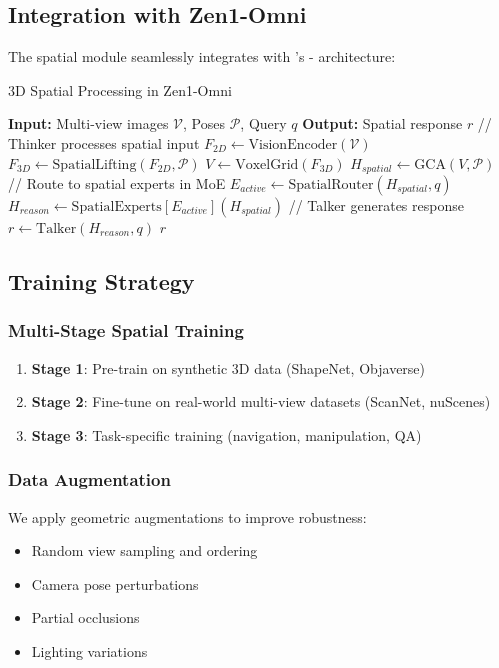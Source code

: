 \subsection{Integration with Zen1-Omni}

The spatial module seamlessly integrates with \zen{}'s \thinker{}-\talker{} architecture:

\begin{algorithm}
\caption{3D Spatial Processing in Zen1-Omni}
\begin{algorithmic}[1]
\STATE \textbf{Input:} Multi-view images $\mathcal{V}$, Poses $\mathcal{P}$, Query $q$
\STATE \textbf{Output:} Spatial response $r$
\STATE // Thinker processes spatial input
\STATE $F_{2D} \leftarrow \text{VisionEncoder}(\mathcal{V})$
\STATE $F_{3D} \leftarrow \text{SpatialLifting}(F_{2D}, \mathcal{P})$
\STATE $V \leftarrow \text{VoxelGrid}(F_{3D})$
\STATE $H_{spatial} \leftarrow \text{GCA}(V, \mathcal{P})$
\STATE // Route to spatial experts in MoE
\STATE $E_{active} \leftarrow \text{SpatialRouter}(H_{spatial}, q)$
\STATE $H_{reason} \leftarrow \text{SpatialExperts}[E_{active}](H_{spatial})$
\STATE // Talker generates response
\STATE $r \leftarrow \text{Talker}(H_{reason}, q)$
\RETURN $r$
\end{algorithmic}
\end{algorithm}

\subsection{Training Strategy}

\subsubsection{Multi-Stage Spatial Training}
\begin{enumerate}
    \item \textbf{Stage 1}: Pre-train on synthetic 3D data (ShapeNet, Objaverse)
    \item \textbf{Stage 2}: Fine-tune on real-world multi-view datasets (ScanNet, nuScenes)
    \item \textbf{Stage 3}: Task-specific training (navigation, manipulation, QA)
\end{enumerate}

\subsubsection{Data Augmentation}
We apply geometric augmentations to improve robustness:
\begin{itemize}
    \item Random view sampling and ordering
    \item Camera pose perturbations
    \item Partial occlusions
    \item Lighting variations
\end{itemize}

